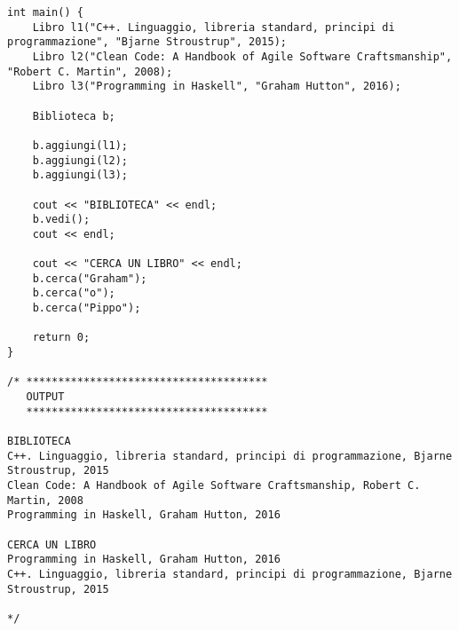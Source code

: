 \documentclass[addpoints,12pt,answers]{exam}
\begin{document}
\begin{lstlisting}[style=mycppbox]
int main() {
    Libro l1("C++. Linguaggio, libreria standard, principi di programmazione", "Bjarne Stroustrup", 2015);
    Libro l2("Clean Code: A Handbook of Agile Software Craftsmanship", "Robert C. Martin", 2008);
    Libro l3("Programming in Haskell", "Graham Hutton", 2016);

    Biblioteca b;

    b.aggiungi(l1);
    b.aggiungi(l2);
    b.aggiungi(l3);

    cout << "BIBLIOTECA" << endl;
    b.vedi();
    cout << endl;

    cout << "CERCA UN LIBRO" << endl;
    b.cerca("Graham");
    b.cerca("o");
    b.cerca("Pippo");

    return 0;
}

/* **************************************
   OUTPUT
   **************************************

BIBLIOTECA
C++. Linguaggio, libreria standard, principi di programmazione, Bjarne Stroustrup, 2015
Clean Code: A Handbook of Agile Software Craftsmanship, Robert C. Martin, 2008
Programming in Haskell, Graham Hutton, 2016

CERCA UN LIBRO
Programming in Haskell, Graham Hutton, 2016
C++. Linguaggio, libreria standard, principi di programmazione, Bjarne Stroustrup, 2015

*/
\end{lstlisting}
    
\end{document}
